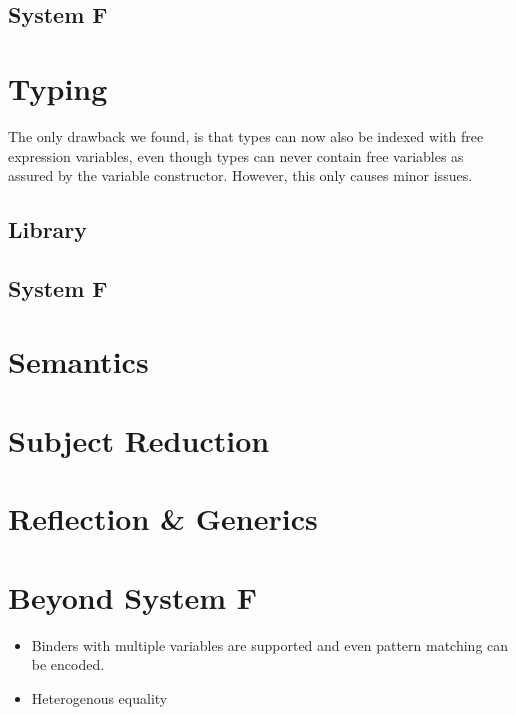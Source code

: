\documentclass[sigplan,10pt]{acmart}
\newenvironment{LibCode*}{%
  \begin{tcolorbox}[%
    colframe=white,%
    boxrule=0.0pt,%
    top=2.5pt,%
    left=2.5pt,%
    bottom=2.5pt,%
    right=2.5pt,%
    boxsep=0pt%
  ]\vspace{-0.2\baselineskip}%
}{%
  \vspace{-1\baselineskip}%
  \end{tcolorbox}%
}
\newcommand*\LibCode[1]{\begin{LibCode*}{#1}\end{LibCode*}}
\newcommand*\AppCode[1]{{#1}}
\begin{document}
  \subsection{System F}
  \AppCode\FTypes

  \section{Typing}
  The only drawback we found, is that types can now also be indexed
  with free expression variables, even though types can never contain
  free variables as assured by the variable constructor. However, this
  only causes minor issues.

  \subsection{Library}
  \LibCode\KVariableTyping
  \LibCode\KTyping
  \LibCode\KTypingKit
  \LibCode\KMapTyping
  \LibCode\KLiftTyping
  \LibCode\KSingleTyping
  \LibCode\KTypingNotation
  \LibCode\KTypingTraversal
  \LibCode\KTypingInstances
  \subsection{System F}
  \AppCode\FTyping
  \AppCode\FTypingInst
  \AppCode\FPreserve
  \AppCode\FTypingTraversal

  \section{Semantics}
  \AppCode\FReduction

  \section{Subject Reduction}
  \AppCode\FSubjectReduction
  \AppCode\FSubjectReductionProofInteresting

  \section{Reflection \& Generics}

  \section{Beyond System F}
  \begin{itemize}
  \item Binders with multiple variables are supported and even pattern matching can be encoded.
  \item Heterogenous equality
  \end{itemize}
\end{document}
